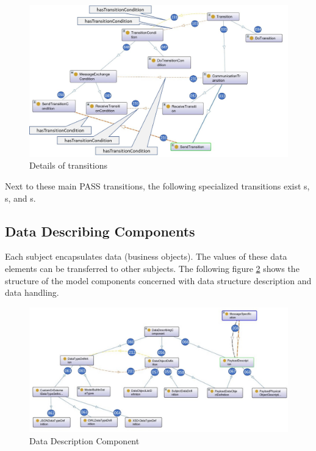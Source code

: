 \begin{figure}[htbp]
	\centering
	\includegraphics[width=1.0\linewidth]{Figures/Ontology/SubjectBehavior/20190105-Transitions}
	\caption[Details of transitions]{Details of transitions}
	\label{fig:20190105-transitions}
\end{figure}

Next to these main PASS transitions, the following specialized transitions exist s, s, and s. 


\subsection{Data Describing Components}

Each subject encapsulates data (business objects). The values of these data elements can be transferred to other subjects. The following figure \ref{fig:20181218-data} shows the structure of the model components concerned with data structure description and data handling.

\begin{figure}[htbp]
	\centering
	\includegraphics[width=0.9\linewidth]{Figures/Ontology/SubjectInteraction/20181218-Data}
	\caption[Data Description Component]{Data Description Component}
	\label{fig:20181218-data}
\end{figure}


